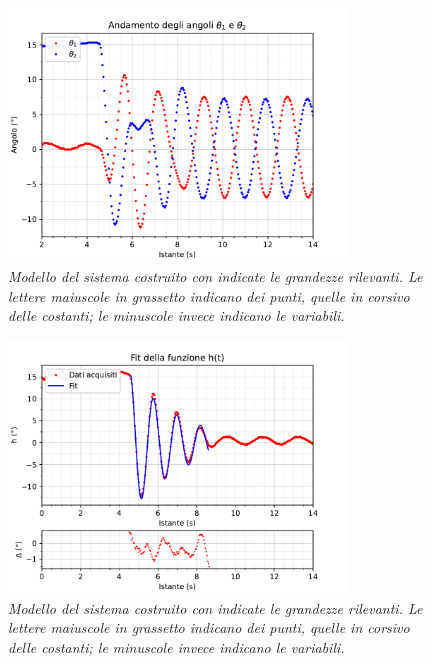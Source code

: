 \documentclass[11pt, a4paper, twoside]{article}
\begin{document}
\begin{figure}[h!]
  \centering
  \includegraphics[width=0.8\textwidth]{../../media/plot/angles_accurate.pdf}
  \caption{\textit{Modello del sistema costruito con indicate
   le grandezze rilevanti. Le lettere maiuscole in grassetto indicano dei punti, quelle in corsivo delle 
   costanti; le minuscole invece indicano le variabili.} }
  \label{anlges_accurate}
\end{figure}

\begin{figure}[h!]
  \centering
  \includegraphics[width=0.8\textwidth]{../../media/plot/fit_h.pdf}
  \caption{\textit{Modello del sistema costruito con indicate
   le grandezze rilevanti. Le lettere maiuscole in grassetto indicano dei punti, quelle in corsivo delle 
   costanti; le minuscole invece indicano le variabili.} }
  \label{fit_h}
\end{figure}
\end{document}
